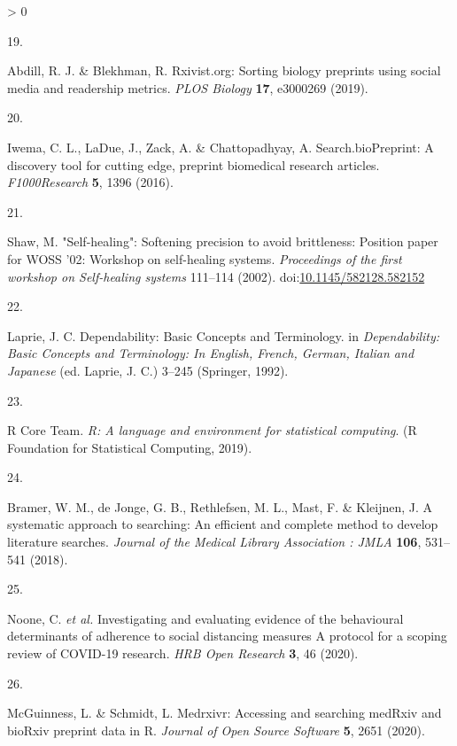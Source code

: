 \documentclass[a4paper, twoside]{templates/ociamthesis}
\newlength{\cslhangindent}
\newlength{\csllabelwidth}
\newenvironment{CSLReferences}[3] %
 {%
  \setlength{\parindent}{0pt}
  \ifodd #1 \everypar{\setlength{\hangindent}{\cslhangindent}}\ignorespaces\fi
  \ifnum #2 > 0
  \setlength{\parskip}{#2\baselineskip}
  \fi
 }%
 {}
\newcommand{\CSLLeftMargin}[1]{\parbox[t]{\maxof{\widthof{#1}}{\csllabelwidth}}{#1}}
\newcommand{\CSLRightInline}[1]{\parbox[t]{\linewidth - \csllabelwidth}{#1}}
\begin{document}
\begin{CSLReferences}{0}{0}
\leavevmode\hypertarget{ref-abdill2019}{}%
\CSLLeftMargin{19. }
\CSLRightInline{Abdill, R. J. \& Blekhman, R. Rxivist.org: {Sorting} biology preprints using social media and readership metrics. \emph{PLOS Biology} \textbf{17}, e3000269 (2019).}

\leavevmode\hypertarget{ref-iwema2016}{}%
\CSLLeftMargin{20. }
\CSLRightInline{Iwema, C. L., LaDue, J., Zack, A. \& Chattopadhyay, A. Search.{bioPreprint}: A discovery tool for cutting edge, preprint biomedical research articles. \emph{F1000Research} \textbf{5}, 1396 (2016).}

\leavevmode\hypertarget{ref-shaw2002}{}%
\CSLLeftMargin{21. }
\CSLRightInline{Shaw, M. "{Self}-healing": Softening precision to avoid brittleness: Position paper for {WOSS} '02: Workshop on self-healing systems. \emph{Proceedings of the first workshop on Self-healing systems} 111--114 (2002). doi:\href{https://doi.org/10.1145/582128.582152}{10.1145/582128.582152}}

\leavevmode\hypertarget{ref-laprie1992}{}%
\CSLLeftMargin{22. }
\CSLRightInline{Laprie, J. C. Dependability: {Basic Concepts} and {Terminology}. in \emph{Dependability: {Basic Concepts} and {Terminology}: {In English}, {French}, {German}, {Italian} and {Japanese}} (ed. Laprie, J. C.) 3--245 ({Springer}, 1992).}

\leavevmode\hypertarget{ref-rcoreteam2019}{}%
\CSLLeftMargin{23. }
\CSLRightInline{R Core Team. \emph{R: {A} language and environment for statistical computing}. ({R Foundation for Statistical Computing}, 2019).}

\leavevmode\hypertarget{ref-bramer2018}{}%
\CSLLeftMargin{24. }
\CSLRightInline{Bramer, W. M., de Jonge, G. B., Rethlefsen, M. L., Mast, F. \& Kleijnen, J. A systematic approach to searching: An efficient and complete method to develop literature searches. \emph{Journal of the Medical Library Association : JMLA} \textbf{106}, 531--541 (2018).}

\leavevmode\hypertarget{ref-noone2020}{}%
\CSLLeftMargin{25. }
\CSLRightInline{Noone, C. \emph{et al.} Investigating and evaluating evidence of the behavioural determinants of adherence to social distancing measures {} {A} protocol for a scoping review of {COVID}-19 research. \emph{HRB Open Research} \textbf{3}, 46 (2020).}

\leavevmode\hypertarget{ref-mcguinness2020a}{}%
\CSLLeftMargin{26. }
\CSLRightInline{McGuinness, L. \& Schmidt, L. Medrxivr: {Accessing} and searching {medRxiv} and {bioRxiv} preprint data in {R}. \emph{Journal of Open Source Software} \textbf{5}, 2651 (2020).}


\end{CSLReferences}
\end{document}
